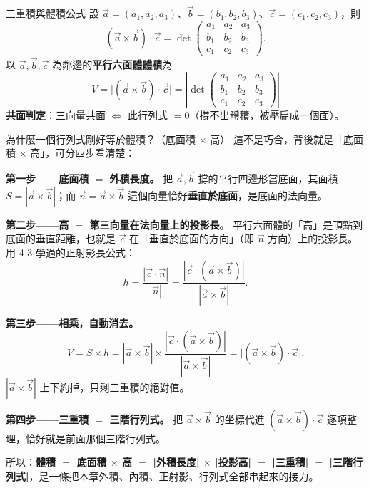 \documentclass[11pt]{article}
\begin{document}
\begin{補充框}{三重積與體積公式}
設 $\vec a=(a_1,a_2,a_3)$、$\vec b=(b_1,b_2,b_3)$、$\vec c=(c_1,c_2,c_3)$，則
$$(\vec a\times\vec b)\cdot\vec c=\det\begin{pmatrix}a_1&a_2&a_3\\ b_1&b_2&b_3\\ c_1&c_2&c_3\end{pmatrix}.$$
以 $\vec a,\vec b,\vec c$ 為鄰邊的\textbf{平行六面體體積}為
$$\boxed{\;V=\bigl|(\vec a\times\vec b)\cdot\vec c\bigr|=\left|\det\begin{pmatrix}a_1&a_2&a_3\\ b_1&b_2&b_3\\ c_1&c_2&c_3\end{pmatrix}\right|\;}$$
\textbf{共面判定}：三向量共面 $\iff$ 此行列式 $=0$（撐不出體積，被壓扁成一個面）。
\end{補充框}


\begin{補充框}{為什麼一個行列式剛好等於體積？（底面積 $\times$ 高）}
這不是巧合，背後就是「底面積 $\times$ 高」，可分四步看清楚：

\textbf{第一步——底面積 $=$ 外積長度。} 把 $\vec a,\vec b$ 撐的平行四邊形當底面，其面積 $S=|\vec a\times\vec b|$；而 $\vec n=\vec a\times\vec b$ 這個向量恰好\textbf{垂直於底面}，是底面的法向量。

\textbf{第二步——高 $=$ 第三向量在法向量上的投影長。} 平行六面體的「高」是頂點到底面的垂直距離，也就是 $\vec c$ 在「垂直於底面的方向」（即 $\vec n$ 方向）上的投影長。用 4-3 學過的正射影長公式：
$$h=\frac{|\vec c\cdot\vec n|}{|\vec n|}=\frac{|\vec c\cdot(\vec a\times\vec b)|}{|\vec a\times\vec b|}.$$

\textbf{第三步——相乘，自動消去。}
$$V=S\times h=|\vec a\times\vec b|\times\frac{|\vec c\cdot(\vec a\times\vec b)|}{|\vec a\times\vec b|}=\bigl|(\vec a\times\vec b)\cdot\vec c\bigr|.$$
$|\vec a\times\vec b|$ 上下約掉，只剩三重積的絕對值。

\textbf{第四步——三重積 $=$ 三階行列式。} 把 $\vec a\times\vec b$ 的坐標代進 $(\vec a\times\vec b)\cdot\vec c$ 逐項整理，恰好就是前面那個三階行列式。

所以：\textbf{體積 $=$ 底面積 $\times$ 高 $=$ |外積長度| $\times$ |投影高| $=$ |三重積| $=$ |三階行列式|}，是一條把本章外積、內積、正射影、行列式全部串起來的接力。
\end{補充框}
\end{document}
